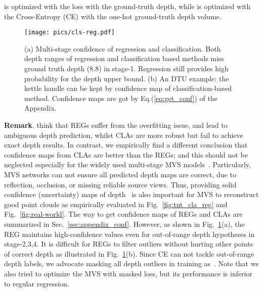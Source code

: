 \documentclass[10pt]{article} \usepackage[preprint]{tmlr}
\begin{document}
 is optimized with the  loss with the ground-truth depth, while  is optimized with the Cross-Entropy (CE) with the one-hot ground-truth depth volume. 

\begin{figure}
\begin{centering}
\texttt{[image: pics/cls-reg.pdf]} 
\par\end{centering}
\caption{(a) Multi-stage confidence of regression and classification.
Both depth ranges of regression and classification based methods miss ground truth depth (8.8) in stage-1. Regression still provides high probability for the depth upper bound. (b) An DTU example: the kettle handle can be kept by confidence map of classification-based method. 
Confidence maps are got by Eq.(\ref{eq:get_conf}) of the Appendix.
}
\label{fig:cls_reg}
\vspace{-0.1in}
\end{figure}

\noindent \textbf{Remark}.
\citet{peng2022rethinking} think that REGs suffer from the overfitting issue, and lead to ambiguous depth prediction, whilst CLAs are more robust but fail to achieve exact depth results.
In contrast, we empirically find a different conclusion that confidence maps from CLAs are better than the REGs; and this should not be neglected especially for the widely used multi-stage MVS models~\citep{gu2020cascade,yang2020cost,mi2021generalized}. Particularly, MVS networks can not ensure all predicted depth maps are correct, due to reflection, occlusion, or missing reliable source views. Thus, providing solid confidence (uncertainty) maps of depth~\citep{kendall2017uncertainties} is also important for MVS to reconstruct good point clouds as empirically evaluated in Fig.~\ref{fig:tnt_cla_reg} and Fig.~\ref{fig:real-world}.
The way to get confidence maps of REGs and CLAs are summarized in Sec.~\ref{sec:appendix_conf}.
However, as shown in Fig.~\ref{fig:cls_reg}(a), the REG maintains high-confidence values even for out-of-range depth hypotheses in stage-2,3,4. 
It is difficult for REGs to filter outliers without hurting other points of correct depth as illustrated in Fig.~\ref{fig:cls_reg}(b). 
Since CE can not tackle out-of-range depth labels, we advocate masking all depth outliers in training as~\citet{mi2021generalized}. Note that we also tried to optimize the MVS with masked  loss, but its performance is inferior to regular regression.
\end{document}
